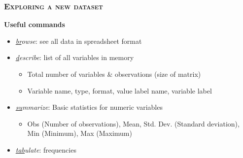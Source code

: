 \documentclass[10pt]{beamer}
\begin{document}
	\begin{frame}
		\frametitle{\textsc{Exploring a new dataset}}
		\begin{center}
			\Large\textbf{Useful commands}
		\end{center}
		\begin{itemize}
			\item 	\textit{\underline{br}owse}: see all data in spreadsheet format
			\item \textit{\underline{d}escribe}: list of all variables in memory
			\begin{itemize}
				\item Total number of variables \& observations (size of matrix)
				\item Variable name, type, format, value label name, variable label
			\end{itemize}
			\item \textit{\underline{su}mmarize}: Basic statistics for numeric variables
			\begin{itemize}
				\item Obs (Number of observations), Mean, Std. Dev. (Standard deviation), Min (Minimum), Max (Maximum)
			\end{itemize}
			\item \textit{\underline{tab}ulate}: frequencies
			
		\end{itemize}
	\end{frame}
\end{document}

